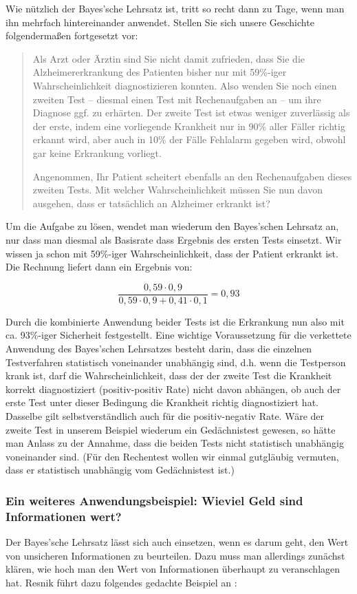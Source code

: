  Wie nützlich der Bayes'sche Lehrsatz ist, tritt so recht dann zu Tage, wenn
 man ihn mehrfach hintereinander anwendet. Stellen Sie sich unsere Geschichte
 folgendermaßen fortgesetzt vor:
  \begin{quotation}
 Als Arzt oder Ärztin sind Sie nicht damit zufrieden, dass Sie die
 Alzheimererkrankung des Patienten bisher nur mit 59\%-iger Wahrscheinlichkeit
 diagnostizieren konnten. Also wenden Sie noch einen zweiten Test -- diesmal
 einen Test mit Rechenaufgaben an -- um ihre Diagnose ggf. zu erhärten. Der
 zweite Test ist etwas weniger zuverlässig als der erste, indem eine
 vorliegende Krankheit nur in 90\% aller Fäller richtig erkannt wird, aber auch
 in 10\% der Fälle Fehlalarm gegeben wird, obwohl gar keine Erkrankung vorliegt.
 
 Angenommen, Ihr Patient scheitert ebenfalls an den Rechenaufgaben dieses
 zweiten Tests. Mit welcher Wahrscheinlichkeit müssen Sie nun davon ausgehen, 
 dass er tatsächlich an Alzheimer erkrankt ist?
 \end{quotation}
Um die Aufgabe zu lösen, wendet man wiederum den Bayes'schen Lehrsatz an, nur
dass man diesmal als Basisrate dass Ergebnis des ersten Tests einsetzt. Wir
wissen ja schon mit 59\%-iger Wahrscheinlichkeit, dass der Patient
erkrankt ist. Die Rechnung liefert dann ein Ergebnis von:

\[ \frac{0,59\cdot 0,9}{0,59\cdot 0,9 + 0,41\cdot 0,1} = 0,93 \]

Durch die kombinierte Anwendung beider Tests ist die Erkrankung nun also
mit ca. 93\%-iger Sicherheit festgestellt. 
Eine wichtige Voraussetzung für die
verkettete Anwendung des Bayes'schen Lehrsatzes besteht darin, dass die
einzelnen Testverfahren statistisch voneinander unabhängig sind, d.h. wenn die
Testperson krank ist, darf die Wahrscheinlichkeit, dass der der zweite Test die
Krankheit korrekt diagnostiziert (positiv-positiv Rate) nicht davon abhängen, ob
auch der erste Test unter dieser Bedingung die Krankheit richtig diagnostiziert hat. 
Dasselbe gilt selbstverständlich auch für die positiv-negativ Rate. Wäre der
zweite Test in unserem Beispiel wiederum ein Gedächnistest gewesen, so hätte man
Anlass zu der Annahme, dass die beiden Tests nicht statistisch unabhängig voneinander
sind. (Für den Rechentest wollen wir einmal gutgläubig vermuten, dass er
statistisch unabhängig vom Gedächnistest ist.)

\subsubsection{Ein weiteres Anwendungsbeispiel: Wieviel Geld sind Informationen
wert?}
\label{WertVonInformtationen}
Der Bayes'sche Lehrsatz lässt sich auch einsetzen, wenn es darum geht, den
Wert von unsicheren Informationen zu beurteilen. Dazu muss man allerdings
zunächst klären, wie hoch man den Wert von Informationen überhaupt zu
veranschlagen hat. Resnik führt dazu folgendes gedachte Beispiel an
\cite[S. 57]{resnik:1987}:

